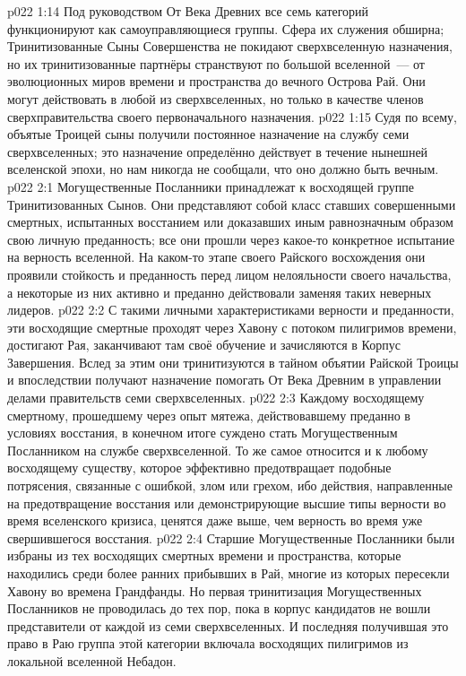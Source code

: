 \vs p022 1:14 Под руководством От Века Древних все семь категорий функционируют как самоуправляющиеся группы. Сфера их служения обширна; Тринитизованные Сыны Совершенства не покидают сверхвселенную назначения, но их тринитизованные партнёры странствуют по большой вселенной~--- от эволюционных миров времени и пространства до вечного Острова Рай. Они могут действовать в любой из сверхвселенных, но только в качестве членов сверхправительства своего первоначального назначения.
\vs p022 1:15 Судя по всему, объятые Троицей сыны получили постоянное назначение на службу семи сверхвселенных; это назначение определённо действует в течение нынешней вселенской эпохи, но нам никогда не сообщали, что оно должно быть вечным.
\vs p022 2:1 Могущественные Посланники принадлежат к восходящей группе Тринитизованных Сынов. Они представляют собой класс ставших совершенными смертных, испытанных восстанием или доказавших иным равнозначным образом свою личную преданность; все они прошли через какое\hyp{}то конкретное испытание на верность вселенной. На каком\hyp{}то этапе своего Райского восхождения они проявили стойкость и преданность перед лицом нелояльности своего начальства, а некоторые из них активно и преданно действовали заменяя таких неверных лидеров.
\vs p022 2:2 С такими личными характеристиками верности и преданности, эти восходящие смертные проходят через Хавону с потоком пилигримов времени, достигают Рая, заканчивают там своё обучение и зачисляются в Корпус Завершения. Вслед за этим они тринитизуются в тайном объятии Райской Троицы и впоследствии получают назначение помогать От Века Древним в управлении делами правительств семи сверхвселенных.
\vs p022 2:3 Каждому восходящему смертному, прошедшему через опыт мятежа, действовавшему преданно в условиях восстания, в конечном итоге суждено стать Могущественным Посланником на службе сверхвселенной. То же самое относится и к любому восходящему существу, которое эффективно предотвращает подобные потрясения, связанные с ошибкой, злом или грехом, ибо действия, направленные на предотвращение восстания или демонстрирующие высшие типы верности во время вселенского кризиса, ценятся даже выше, чем верность во время уже свершившегося восстания.
\vs p022 2:4 Старшие Могущественные Посланники были избраны из тех восходящих смертных времени и пространства, которые находились среди более ранних прибывших в Рай, многие из которых пересекли Хавону во времена Грандфанды. Но первая тринитизация Могущественных Посланников не проводилась до тех пор, пока в корпус кандидатов не вошли представители от каждой из семи сверхвселенных. И последняя получившая это право в Раю группа этой категории включала восходящих пилигримов из локальной вселенной Небадон.
